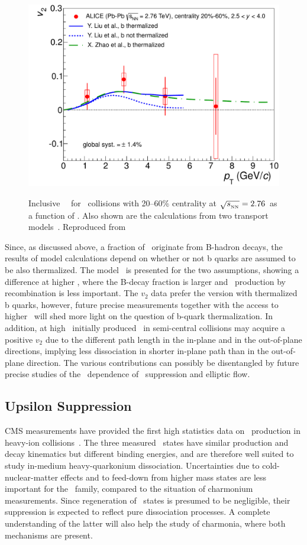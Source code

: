 \begin{figure}[!ht]
\begin{center}
\includegraphics[width=0.49\linewidth]{quarkoniafigs/prl_fig4-eps-converted-to.pdf}
\label{fig:KS:v2ptcomp} 
\caption{Inclusive \jpsi\ \vtwo\
for \PbPb\ collisions with 20--60\% centrality at $\sqrt{s_{_{\rm NN}}} = 2.76$\TeV\ as a function of \pT.
Also shown are the calculations from two transport models~\cite{Liu:2009gx,Zhao:2012gc}.
Reproduced from~\cite{ALICE:2013xna}}
\end{center}
\end{figure}

 Since, as discussed above, a fraction of \Jpsi\ originate from B-hadron decays, the results of model calculations depend on whether or not b quarks are assumed to be also thermalized. The model~\cite{Liu:2009gx} is presented for the two assumptions, showing a difference at higher \pt, where the B-decay fraction is larger and \Jpsi\ production by recombination is less important. The $v_2$ data prefer the version with thermalized b quarks, however, future precise measurements together with the access to higher \pt\ will shed more light on the question of b-quark thermalization. In addition, at high \pt\ initially produced \Jpsi\ in semi-central collisions may acquire a positive $v_2$ due to the different path length in the in-plane and in the out-of-plane directions, implying less dissociation in shorter in-plane path than in the out-of-plane direction. The various contributions can possibly be disentangled
by future precise studies of the \pT\ dependence of \Jpsi\ suppression and elliptic flow.

\subsection{Upsilon Suppression}

CMS measurements have provided the first high statistics data on \PgU\ production in heavy-ion collisions~\cite{CMS_Y_2010}. The three measured \PgU\ states have similar production and decay kinematics but different binding energies, and are therefore well suited to study in-medium heavy-quarkonium dissociation.
Uncertainties due to cold-nuclear-matter effects and to feed-down from higher mass states are less important for the \PgU\ family, compared to the situation of charmonium measurements. Since regeneration of \PgU\ states is presumed to be negligible, their suppression is expected to reflect pure dissociation processes. A complete understanding of the latter will also help the study of charmonia, where both mechanisms are present.

